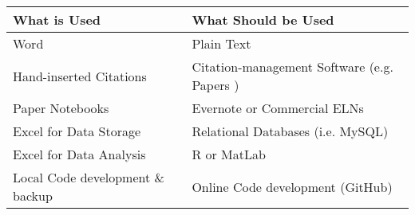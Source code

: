 \footnotesize
\begin{tabular}{p{6cm}|p{8cm}}

\textbf{What is Used}            & \textbf{What Should be Used}                \\ \hline 
Word                             & Plain Text                                  \\ \hline 
Hand-inserted Citations          & Citation-management Software (e.g. Papers ) \\ \hline 
Paper Notebooks                  & Evernote or Commercial ELNs                 \\ \hline 
Excel for Data Storage                & Relational Databases (i.e. MySQL)           \\ \hline 
Excel for Data Analysis               & R or MatLab                                           \\ \hline 
Local Code development \& backup & Online Code development (GitHub)            \\ \hline 
\end{tabular}


